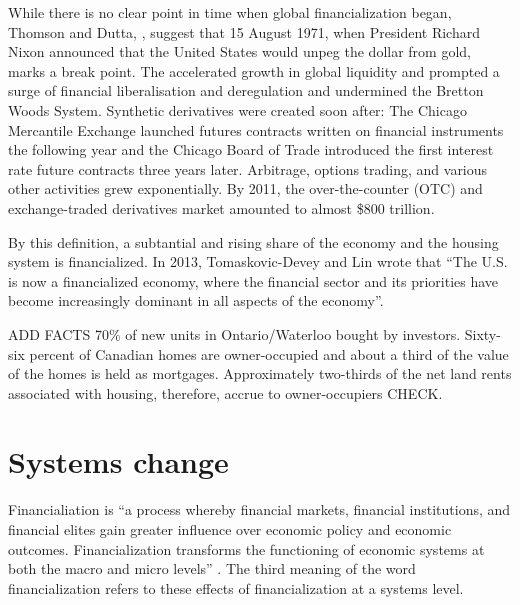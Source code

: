 While there is no clear point in time when global financialization began, Thomson and Dutta,  \cite{thomsonFinancialisationPrimer2018}, suggest that 15 August 1971, when President Richard Nixon announced that the United States would unpeg the dollar from gold, marks a break point. The accelerated growth in global liquidity and prompted a surge of financial liberalisation and deregulation and undermined the Bretton Woods System.  Synthetic derivatives were created soon after: The Chicago Mercantile Exchange launched futures contracts written on financial instruments the following year and the Chicago Board of Trade introduced the first interest rate future contracts three years later. Arbitrage, options trading, and various other activities grew exponentially. By 2011, the over-the-counter (OTC) and exchange-traded derivatives market amounted to almost \$800 trillion.  %

By this definition, a subtantial and rising share of the economy and the housing system is financialized. 
In 2013, Tomaskovic-Devey and Lin wrote that ``The U.S. is now a financialized economy, where the financial sector and its priorities have become increasingly dominant in all aspects of the economy''\cite{tomaskovic-deveyFinancializationCausesInequality2013}. 

ADD FACTS 70\% of new units in Ontario/Waterloo bought by investors.
Sixty-six percent of Canadian homes are owner-occupied and about a third of the value of the homes is held as mortgages. Approximately two-thirds of the net land rents associated with housing, therefore, accrue to owner-occupiers \cite{nemtinFinancializationHousingSocial2021} CHECK. %


\section{Systems change}
Financialiation is %
``a process whereby financial markets, financial institutions, and financial elites gain greater influence over economic policy and economic outcomes. Financialization transforms the functioning of economic systems at both the macro and micro levels'' \cite{palleyFinancializationWhatIt2007}. 
The third meaning of the word financialization refers to these effects of financialization at a systems level. 

